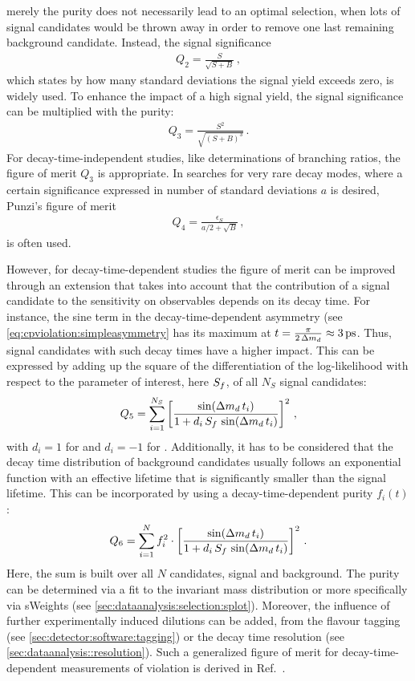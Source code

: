 merely the purity does not necessarily lead to an optimal selection, \eg when
lots of signal candidates would be thrown away in order to remove one last
remaining background candidate. Instead, the signal significance
\begin{align}
	Q_2 = \frac{S}{\sqrt{S + B}}\,,
\end{align}
which states by how many standard deviations the signal yield exceeds zero, is
widely used. To enhance the impact of a high signal yield, the signal
significance can be multiplied with the purity:
\begin{align}
	Q_3 = \frac{S^2}{\sqrt{(S + B)^3}}\,.
\end{align}
For decay-time-independent studies, like determinations of branching ratios,
the figure of merit $Q_3$ is appropriate. In searches for very rare decay
modes, where a certain significance expressed in number of standard deviations
$a$ is desired, Punzi's figure of merit~\cite{Punzi:2003bu}
\begin{align}
	Q_4 = \frac{\epsilon_S}{a/2 + \sqrt{B}}\,,
\end{align}
is often used.

However, for decay-time-dependent studies the figure of merit can be improved
through an extension that takes into account that the contribution of a signal
candidate to the sensitivity on \CP observables depends on its decay time. For
instance, the sine term in the decay-time-dependent asymmetry (see
\cref{eq:cpviolation:simpleasymmetry} has its maximum at $t =
\frac{\pi}{2\,\dmd} \approx \SI{3}{\ps}$. Thus, signal candidates with such
decay times have a higher impact. This can be expressed by adding up the
square of the differentiation of the log-likelihood with respect to the
parameter of interest, here $S_{f}$, of all $N_S$ signal candidates:
\begin{align}
	Q_5 = \sum_{i=1}^{N_S} \left[\frac{\sin({\Delta m_{{d}}}\,t_i)}{1 + d_i\,S_f\,\sin({\Delta m_{{d}}}\,t_i)}\right]^2\,,
\end{align}
with $d_i = \num{+1}$ for \Bd and $d_i = \num{-1}$ for \Bdb. Additionally, it
has to be considered that the decay time distribution of background candidates
usually follows an exponential function with an effective lifetime that is
significantly smaller than the \Bd signal lifetime. This can be incorporated
by using a decay-time-dependent purity $f_i(t)$:
\begin{align}
	Q_6 = \sum_{i=1}^{N} f_i^2 \cdot \left[\frac{\sin({\Delta m_{{d}}}\,t_i)}{1 + d_i\,S_f\,\sin({\Delta m_{{d}}}\,t_i)}\right]^2\,.
\end{align}
Here, the sum is built over all $N$ candidates, signal and background. The
purity can be determined via a fit to the invariant mass distribution or more
specifically via sWeights (see \cref{sec:dataanalysis:selection:splot}).
Moreover, the influence of further experimentally induced dilutions can be
added, \eg from the flavour tagging (see \cref{sec:detector:software:tagging})
or the decay time resolution (see \cref{sec:dataanalysis::resolution}). Such a
generalized figure of merit for decay-time-dependent measurements of
\CP violation is derived in Ref.~\cite{FOM}.